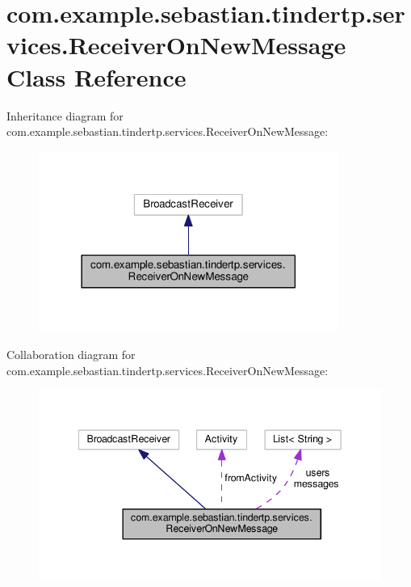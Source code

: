 \hypertarget{classcom_1_1example_1_1sebastian_1_1tindertp_1_1services_1_1ReceiverOnNewMessage}{}\section{com.\+example.\+sebastian.\+tindertp.\+services.\+Receiver\+On\+New\+Message Class Reference}
\label{classcom_1_1example_1_1sebastian_1_1tindertp_1_1services_1_1ReceiverOnNewMessage}


Inheritance diagram for com.\+example.\+sebastian.\+tindertp.\+services.\+Receiver\+On\+New\+Message\+:\nopagebreak
\begin{figure}[H]
\begin{center}
\leavevmode
\includegraphics[width=278pt]{classcom_1_1example_1_1sebastian_1_1tindertp_1_1services_1_1ReceiverOnNewMessage__inherit__graph}
\end{center}
\end{figure}


Collaboration diagram for com.\+example.\+sebastian.\+tindertp.\+services.\+Receiver\+On\+New\+Message\+:\nopagebreak
\begin{figure}[H]
\begin{center}
\leavevmode
\includegraphics[width=342pt]{classcom_1_1example_1_1sebastian_1_1tindertp_1_1services_1_1ReceiverOnNewMessage__coll__graph}
\end{center}
\end{figure}
